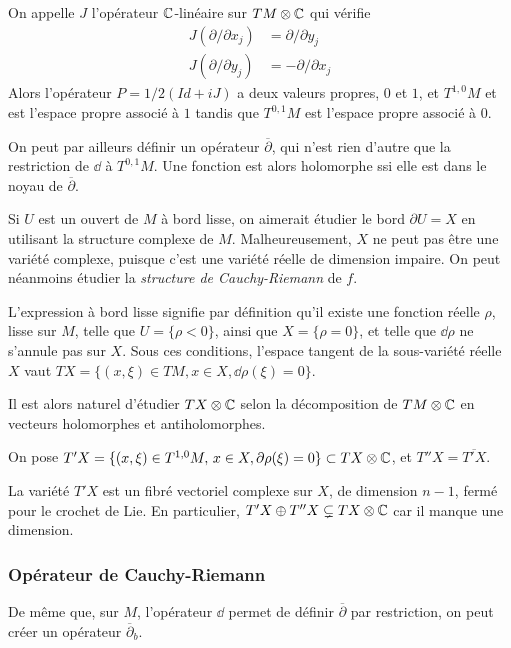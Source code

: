 On appelle $J$ l'opérateur $\mathbb{C}$-linéaire sur $TM \otimes \mathbb{C}$ qui vérifie
\begin{align*}
	J(\partial/\partial x_j) &= \partial/\partial y_j\\
	J(\partial/\partial y_j) &= -\partial/\partial x_j
\end{align*}
Alors l'opérateur $P=1/2(Id+iJ)$ a deux valeurs propres, $0$ et $1$, et $T^{1,0}M$ et est l'espace propre associé à $1$ tandis que $T^{0,1}M$ est l'espace propre associé à $0$.

On peut par ailleurs définir un opérateur $\overline{\partial}$, qui n'est rien d'autre que la restriction de $\dd$ à $T^{0,1}M$. Une fonction est alors holomorphe ssi elle est dans le noyau de $\overline{\partial}$.

Si $U$ est un ouvert de $M$ à bord lisse, on aimerait étudier le bord $\partial U=X$ en utilisant la structure complexe de $M$. Malheureusement, $X$ ne peut pas être une variété complexe, puisque c'est une variété réelle de dimension impaire. On peut néanmoins étudier la \emph{structure de Cauchy-Riemann} de $f$.

L'expression \og à bord lisse \fg signifie par définition qu'il existe une fonction réelle $\rho$, lisse sur $M$, telle que $U=\{\rho<0\}$, ainsi que $X=\{\rho=0\}$, et telle que $\dd\rho$ ne s'annule pas sur $X$. Sous ces conditions, l'espace tangent de la sous-variété réelle $X$ vaut $TX =\{(x,\xi)\in TM, x\in X, \dd\rho(\xi)=0\}$.

Il est alors naturel d'étudier $TX \otimes \mathbb{C}$ selon la décomposition de $TM \otimes \mathbb{C}$ en vecteurs holomorphes et antiholomorphes.
\begin{defn}
	On pose $T'X=\{(x,\xi)\in T^{1,0}M,\,x \in X, \partial \rho(\xi)=0\} \subset TX \otimes \mathbb{C}$, et $T''X=\overline{T'X}$.
\end{defn}

\begin{rem}
	La variété $T'X$ est un fibré vectoriel complexe sur $X$, de dimension $n-1$, fermé pour le crochet de Lie. En particulier, $T'X \oplus T''X \subsetneq TX \otimes \mathbb{C}$ car il manque une dimension.
\end{rem}

\subsubsection{Opérateur de Cauchy-Riemann}
De même que, sur $M$, l'opérateur $\dd$ permet de définir $\overline{\partial}$ par restriction, on peut créer un opérateur $\overline{\partial}_b$. 


